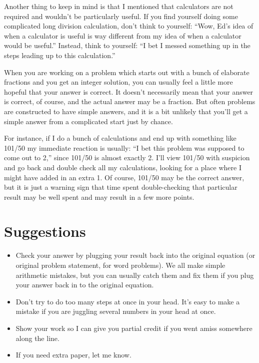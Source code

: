 \documentclass[fleqn,addpoints]{exam}
\begin{document}
Another thing to keep in mind is that I mentioned that calculators are not required and wouldn't be particularly
useful.  If you find yourself doing some complicated long division calculation, don't think to yourself: ``Wow, Ed's idea
of when a calculator is useful is way different from my idea of when a calculator would be useful.''  Instead, think to
yourself: ``I bet I messed something up in the steps leading up to this calculation.''

When you are working on a problem which starts out with a bunch of elaborate fractions and you get an integer solution,
you can usually feel a little more hopeful that your answer is correct.  It doesn't necessarily mean that your answer is
correct, of course, and the actual answer may be a fraction.  But often problems are constructed to have simple answers,
and it is a bit unlikely that you'll get a simple answer from a complicated start just by chance.

For instance, if I do a bunch of calculations and end up with something like 101/50 my immediate reaction is usually:
``I bet this problem was supposed to come out to 2,'' since 101/50 is almost exactly 2.  I'll view 101/50 with suspicion and go
back and double check all my calculations, looking for a place where I might have added in an extra 1.  Of course,
101/50 may be the correct answer, but it is just a warning sign that time spent double-checking that particular result
may be well spent and may result in a few more points.
 
\else
\vspace{0.2in}
\vspace{0.2in}

\begin{center}
\gradetable[h][pages]
\end{center}

\section{Suggestions}

\begin{itemize}
  \item Check your answer by plugging your result back into the original equation (or original problem statement,
    for word problems).  We all make simple arithmetic mistakes, but you can usually catch them and fix them if you plug
    your answer back in to the original equation.
  \item Don't try to do too many steps at once in your head.  It's easy to make a mistake if you are juggling several
    numbers in your head at once.
  \item Show your work so I can give you partial credit if you went amiss somewhere along the line.
  \item If you need extra paper, let me know.
\end{itemize}
\end{document}

